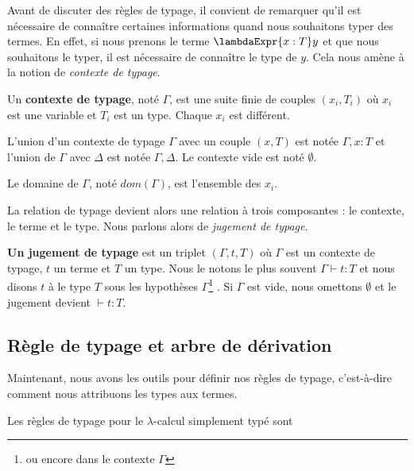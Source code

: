 Avant de discuter des règles de typage, il convient de remarquer qu'il est
nécessaire de connaître certaines informations quand nous souhaitons typer des
termes. En effet, si nous prenons le terme $\lambdaExpr{x : T} y$ et que nous
souhaitons le typer, il est nécessaire de connaître le type de $y$. Cela nous
amène à la notion de \textit{contexte de typage}.

\begin{definition} 
  \label{def:simply-typed-lambda-calculus-context}
  Un \textbf{contexte de typage}, noté $\Gamma$, est une suite finie de couples $(x_{i},
  T_{i})$ où $x_{i}$ est une variable et $T_{i}$ est un type. Chaque $x_{i}$ est différent.

  L'union d'un contexte de typage $\Gamma$ avec un couple $(x, T)$ est notée
  $\Gamma, x : T$ et l'union de $\Gamma$ avec $\Delta$ est notée $\Gamma, \Delta$.
  Le contexte vide est noté $\emptyset$.

  Le domaine de $\Gamma$, noté $dom(\Gamma)$, est l'ensemble des $x_{i}$.
\end{definition}

La relation de typage devient alors une relation à trois composantes : le
contexte, le terme et le type. Nous parlons alors de \textit{jugement de typage}.

\begin{definition} 
  \label{def:simply-typed-lambda-calculus-judgement}
  \textbf{Un jugement de typage} est un triplet $(\Gamma, t, T)$ où $\Gamma$ est un
  contexte de typage, $t$ un terme et $T$ un type. Nous le notons le plus
  souvent $\Gamma \vdash t : T$ et nous disons \og $t$ à le type $T$ sous les
  hypothèses $\Gamma$\footnote{ou encore dans le contexte $\Gamma$} \fg.
  Si $\Gamma$
  est vide, nous omettons $\emptyset$ et le jugement devient $\vdash t : T$.
\end{definition}

\subsection*{Règle de typage et arbre de dérivation}

Maintenant, nous avons les outils pour définir nos règles de typage,
c'est-à-dire comment nous attribuons les types aux termes.

\begin{definition} 
  \label{def:simply-typed-lambda-calculus-typing-rules}
  Les règles de typage pour le $\lambda$-calcul simplement typé sont
\end{definition}

